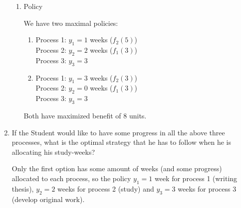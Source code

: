 \begin{prob}
\begin{enumerate}[label = {\textbf{(\greek*)}}]
\begin{sol}
\begin{enumerate}[start = 1, label = {\protect\tsc{$\mathbf{S_{\arabic*}}$}}]
\item Policy

We have two maximal policies:

\begin{enumerate}
    \item 
    Process 1: $y_1=1$ weeks ($f_2(5)$) \\
    Process 2: $y_2=2$ weeks ($f_1(3)$) \\
    Process 3: $y_3=3$
    
    \item 
    Process 1: $y_1=3$ weeks ($f_2(3)$) \\
    Process 2: $y_2=0$ weeks ($f_1(3)$) \\
    Process 3: $y_3=3$
\end{enumerate}

Both have maximized benefit of 8 units.
\end{enumerate}
    \end{sol}
    \item If the Student would like to have some progress in all the above three processes, what is the optimal strategy that he has to follow when he is allocating his study-weeks?
    
    \begin{sol}
    Only the first option has some amount of weeks (and some progress) allocated to each process, so the policy $y_1=1$ week for process 1 (writing thesis), $y_2=2$ weeks for process 2 (study) and $y_3=3$ weeks for process 3 (develop original work).
    \end{sol}
\end{enumerate}
\end{prob}

\pagebreak

